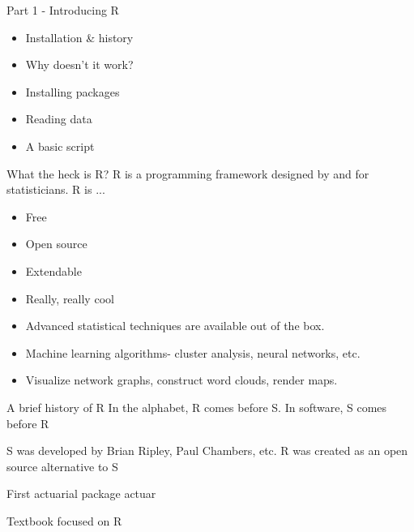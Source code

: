\documentclass[xcolor=dvipsnames]{beamer}
\begin{document}
\begin{frame}{Part 1 - Introducing R}
  \begin{itemize}
    \item Installation \& history
    \item Why doesn't it work?
    \item Installing packages
    \item Reading data
    \item A basic script
  \end{itemize}
\end{frame}

\begin{frame}{What the heck is R?}
  R is a programming framework designed by and for statisticians. R is ... 
  \begin{itemize}
    \item Free %
    \item Open source %
    \item Extendable %
    \item Really, really cool 
      \item Advanced statistical techniques are available out of the box. 
      \item Machine learning algorithms- cluster analysis, neural networks, etc.%
      \item Visualize network graphs, construct word clouds, render maps. %
  \end{itemize}
\end{frame}

\begin{frame}{A brief history of R}
In the alphabet, R comes before S. In software, S comes before R

S was developed by Brian Ripley, Paul Chambers, etc.
R was created as an open source alternative to S

First actuarial package actuar

Textbook focused on R
\end{frame}
\end{document}
